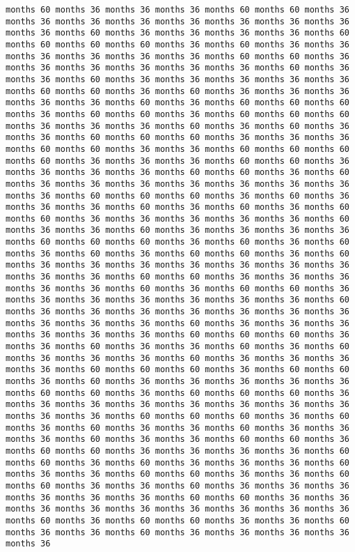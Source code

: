 \documentclass[11pt]{article}
\begin{document}
\begin{Verbatim}[commandchars=\\\{\}, frame=single, framerule=2mm, rulecolor=\color{outerrorbackground}]
months 60 months 36 months 36 months 36 months 60 months 60 months 36 months 36 months 36 months 36 months 36 months 36 months 36 months 36 months 36 months 60 months 36 months 36 months 36 months 36 months 60 months 60 months 60 months 60 months 36 months 60 months 36 months 36 months 36 months 36 months 36 months 36 months 60 months 60 months 36 months 36 months 36 months 36 months 36 months 36 months 60 months 36 months 36 months 60 months 36 months 36 months 36 months 36 months 36 months 60 months 60 months 36 months 60 months 36 months 36 months 36 months 36 months 36 months 60 months 36 months 60 months 60 months 60 months 36 months 60 months 60 months 36 months 60 months 60 months 60 months 36 months 36 months 36 months 60 months 36 months 60 months 36 months 36 months 60 months 60 months 60 months 36 months 36 months 36 months 60 months 60 months 36 months 36 months 60 months 60 months 60 months 60 months 36 months 36 months 36 months 60 months 60 months 36 months 36 months 36 months 36 months 60 months 60 months 36 months 60 months 36 months 36 months 36 months 36 months 36 months 36 months 36 months 36 months 60 months 60 months 60 months 36 months 60 months 36 months 36 months 36 months 60 months 36 months 60 months 36 months 60 months 60 months 36 months 36 months 36 months 36 months 36 months 60 months 36 months 36 months 60 months 36 months 36 months 36 months 36 months 60 months 60 months 60 months 36 months 60 months 36 months 60 months 36 months 60 months 36 months 60 months 60 months 36 months 60 months 36 months 36 months 36 months 36 months 36 months 36 months 36 months 36 months 36 months 60 months 60 months 36 months 36 months 36 months 36 months 36 months 60 months 36 months 60 months 60 months 36 months 36 months 36 months 36 months 36 months 36 months 36 months 60 months 36 months 36 months 36 months 36 months 36 months 36 months 36 months 36 months 36 months 36 months 60 months 36 months 36 months 36 months 36 months 36 months 36 months 60 months 60 months 60 months 36 months 36 months 60 months 36 months 36 months 60 months 36 months 60 months 36 months 36 months 36 months 60 months 36 months 36 months 36 months 36 months 60 months 60 months 60 months 36 months 60 months 60 months 36 months 60 months 36 months 36 months 36 months 36 months 36 months 60 months 60 months 36 months 60 months 60 months 60 months 36 months 36 months 36 months 36 months 36 months 36 months 36 months 36 months 36 months 36 months 60 months 60 months 60 months 36 months 60 months 36 months 60 months 36 months 36 months 60 months 36 months 36 months 36 months 60 months 36 months 36 months 60 months 60 months 36 months 60 months 60 months 36 months 36 months 36 months 36 months 60 months 60 months 36 months 60 months 36 months 36 months 36 months 60 months 36 months 36 months 60 months 60 months 36 months 36 months 60 months 60 months 36 months 36 months 60 months 36 months 36 months 36 months 36 months 36 months 36 months 60 months 60 months 36 months 36 months 36 months 36 months 36 months 36 months 36 months 36 months 36 months 60 months 36 months 60 months 60 months 36 months 36 months 60 months 36 months 36 months 60 months 36 months 36 months 36 months 36 months 36 
\end{Verbatim}
\end{document}
